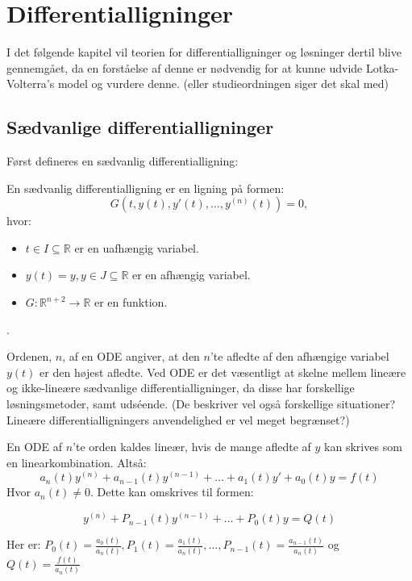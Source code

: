 \chapter{Differentialligninger}
I det følgende kapitel vil teorien for differentialligninger og løsninger dertil blive gennemgået, da en forståelse af denne er nødvendig for at kunne udvide Lotka-Volterra's model og vurdere denne. (eller studieordningen siger det skal med)
\section{Sædvanlige differentialligninger}
Først defineres en sædvanlig differentialligning:
\begin{definition}
En sædvanlig differentialligning er en ligning på formen: \hfill \break
$$G(t,y(t),y'(t), \hdots , y^{(n)}(t))=0,$$
hvor:
\begin{itemize}
    \item $t \in I \subseteq \mathbb{R}$ er en uafhængig variabel.
    \item $y(t) = y, y\in J \subseteq \mathbb{R}$ er en afhængig variabel.
    \item $G:\mathbb{R}^{n+2} \rightarrow \mathbb{R}$ er en funktion.
\end{itemize}.
\end{definition}
Ordenen, $n$, af en ODE angiver, at den $n$'te afledte af den afhængige variabel $y(t)$ er den højest afledte. Ved ODE er det væsentligt at skelne mellem lineære og ikke-lineære sædvanlige differentialligninger, da disse har forskellige løsningsmetoder, samt udséende. (De beskriver vel også forskellige situationer? Lineære differentialligningers anvendelighed er vel meget begrænset?)
\begin{definition}\label{OLDE}En ODE af $n$'te orden kaldes lineær, hvis de mange afledte af $y$ kan skrives som en linearkombination. Altså: \\ 
$$a_{n}(t)y^{(n)}  + a_{n-1}(t)y^{(n-1)}+ \hdots + a_{1}(t)y' + a_{0}(t)y = f(t)$$
Hvor $a_n(t)\neq 0$. Dette kan omskrives til formen:

$$y^{(n)}+P_{n-1}(t)y^{(n-1)}+\hdots +P_0(t)y=Q(t)$$ 

Her er: $P_0(t)=\frac{a_0(t)}{a_n(t)} , P_1(t)=\frac{a_1(t)}{a_n(t)}, \hdots, P_{n-1}(t)=\frac{a_{n-1}(t)}{a_n(t)}$ og $Q(t)=\frac{f(t)}{a_n(t)}$
\end{definition}

